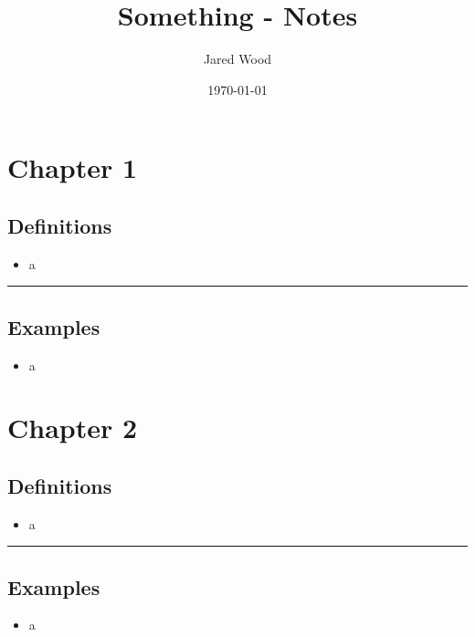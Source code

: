 \documentclass[12pt]{article}
\title{Something - Notes}
\author{Jared Wood}
\date{\today}
\begin{document}
\hypertarget{toc}{}
\maketitle
\tableofcontents


\newpage
\section{Chapter 1}

\subsection{Definitions}
\begin{itemize}
    \item a
\end{itemize}
\noindent\rule{\linewidth}{1pt}

\subsection{Examples}
\begin{itemize}
    \item a
\end{itemize}

\newpage
\section{Chapter 2}

\subsection{Definitions}
\begin{itemize}
    \item a
\end{itemize}
\noindent\rule{\linewidth}{1pt}

\subsection{Examples}
\begin{itemize}
    \item a
\end{itemize}
\end{document}
